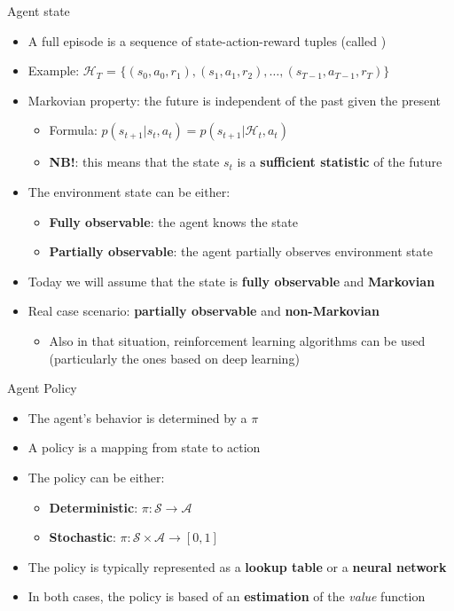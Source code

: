 \documentclass[presentation, 9pt]{beamer}\mode<presentation>{\usetheme{AMSBolognaFC}}
\begin{document}
\begin{frame}{Agent state}
\begin{itemize}
	\item A full episode is a sequence of state-action-reward tuples (called )
	
	\item Example: $\mathcal{H}_T$ = $\{ (s_0, a_0, r_1), (s_1, a_1, r_2), \dots, (s_{T-1}, a_{T-1}, r_T) \}$
	\item Markovian property: the future is independent of the past given the present
	\begin{itemize}
		\item Formula: $p(s_{t+1} | s_t, a_t) = p(s_{t+1} | \mathcal{H}_t, a_t)$
		\item \textbf{NB!}: this means that the state $s_t$ is a \textbf{sufficient statistic} of the future
	\end{itemize}
	\item The environment state can be either:
	\begin{itemize}
		\item \textbf{Fully observable}: the agent knows the state
		\item \textbf{Partially observable}: the agent partially observes environment state 
	\end{itemize}
	\item Today we will assume that the state is \textbf{fully observable} and \textbf{Markovian}
	\item Real case scenario: \textbf{partially observable} and \textbf{non-Markovian}
	\begin{itemize}
		\item Also in that situation, reinforcement learning algorithms can be used (particularly the ones based on deep learning)
	\end{itemize}
\end{itemize}
\end{frame}
\begin{frame}{Agent Policy}
\begin{itemize}
	\item The agent's behavior is determined by a  $\pi$
	\item A policy is a mapping from state to action
	\item The policy can be either:
	\begin{itemize}
		\item \textbf{Deterministic}: $\pi: \mathcal{S} \rightarrow \mathcal{A}$
		\item \textbf{Stochastic}: $\pi: \mathcal{S} \times \mathcal{A} \rightarrow [0,1]$
	\end{itemize}
	\item The policy is typically represented as a \textbf{lookup table} or a \textbf{neural network}
	\item In both cases, the policy is based of an \textbf{estimation} of the \emph{value} function
\end{itemize}
\end{frame}
\end{document}
